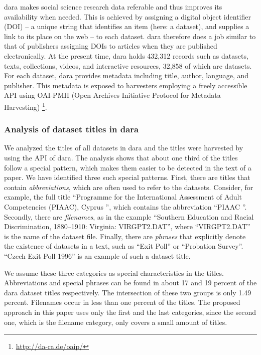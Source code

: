 \documentclass{IOS-Book-Article}
\newcommand{\dara}{\textsf{da\textbar ra}}
\begin{document}
{\dara} makes social science research data referable and thus improves its availability when needed. 
This is achieved by assigning a digital object identifier (DOI) -- a unique string that identifies an item (here: a dataset), and supplies a link to its place on the web -- to each dataset. {\dara} therefore does a job similar to that of publishers assigning DOIs to articles when they are published electronically.
At the present time, {\dara} holds 432,312 records such as datasets, texts, collections, videos, and interactive resources, 32,858 of which are datasets. 
For each dataset, {\dara} provides metadata including title, author, language, and publisher. This metadata is exposed to harvesters employing a freely accessible API using OAI-PMH (Open Archives Initiative Protocol for Metadata Harvesting) \footnote{\url{http://da-ra.de/oaip/}}. 
  
  \subsubsection{Analysis of dataset titles in {\dara}}
We analyzed the titles of all datasets in {\dara} and the titles were harvested by using the API of {\dara}. The analysis shows that about one third of the titles follow a special pattern, which makes them easier to be detected in the text of a paper. We have identified three such special patterns. First, there are titles that contain \emph{abbreviations}, which are often used to refer to the datasets. 
Consider, for example, the full title \enquote{Programme for the International Assessment of Adult Competencies (PIAAC), Cyprus }, which contains the abbreviation \enquote{PIAAC }. Secondly, there are \emph{filenames}, as in the example \enquote{Southern Education and Racial Discrimination, 1880--1910: Virginia: VIRGPT2.DAT}, where \enquote{VIRGPT2.DAT} is the name of the dataset file. Finally, there are \emph{phrases} that explicitly denote the existence of datasets in a text, such as \enquote{Exit Poll} or \enquote{Probation Survey}. \enquote{Czech Exit Poll 1996} is an example of such a dataset title. 

We assume these three categories as special characteristics in the titles. Abbreviations and special phrases can be found in about 17 and 19 percent of the {\dara} dataset titles respectively. The intersection of these two groups is only 1.49 percent. Filenames occur in less than one percent of the titles. 
The proposed approach in this paper uses only the first and the last categories, since the second one, which is the filename category, only covers a small amount of titles.
\end{document}
